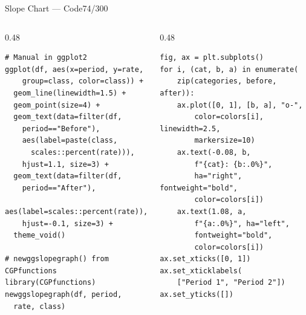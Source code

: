 \documentclass[10pt]{beamer}
\newcommand{\smark}[1]{\hfill{\scriptsize\color{codegray}#1}}
\begin{document}
\begin{frame}[fragile]{Slope Chart --- Code}\smark{74/300}
\begin{columns}[T]
\begin{column}{0.48\textwidth}
\begin{lstlisting}[style=Rstyle]
# Manual in ggplot2
ggplot(df, aes(x=period, y=rate,
    group=class, color=class)) +
  geom_line(linewidth=1.5) +
  geom_point(size=4) +
  geom_text(data=filter(df,
    period=="Before"),
    aes(label=paste(class,
      scales::percent(rate))),
    hjust=1.1, size=3) +
  geom_text(data=filter(df,
    period=="After"),
    aes(label=scales::percent(rate)),
    hjust=-0.1, size=3) +
  theme_void()

# newggslopegraph() from CGPfunctions
library(CGPfunctions)
newggslopegraph(df, period,
  rate, class)
\end{lstlisting}
\end{column}
\begin{column}{0.48\textwidth}
\begin{lstlisting}[style=Pystyle]
fig, ax = plt.subplots()
for i, (cat, b, a) in enumerate(
    zip(categories, before, after)):
    ax.plot([0, 1], [b, a], "o-",
        color=colors[i], linewidth=2.5,
        markersize=10)
    ax.text(-0.08, b,
        f"{cat}: {b:.0%}",
        ha="right", fontweight="bold",
        color=colors[i])
    ax.text(1.08, a,
        f"{a:.0%}", ha="left",
        fontweight="bold",
        color=colors[i])
ax.set_xticks([0, 1])
ax.set_xticklabels(
    ["Period 1", "Period 2"])
ax.set_yticks([])
\end{lstlisting}
\end{column}
\end{columns}
\end{frame}
\end{document}
